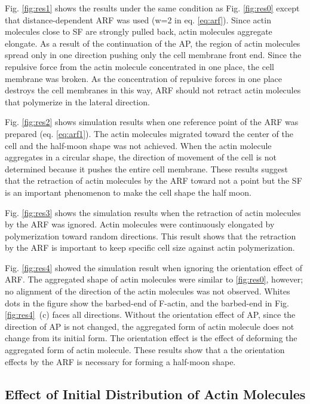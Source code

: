 \documentclass[a4paper,12pt, oneside]{book}
\begin{document}
Fig. \ref{fig:res1} shows the results under the same condition as Fig. \ref{fig:res0} except that distance-dependent ARF was  used (w=2 in eq. \ref{eq:arf}).
Since actin molecules close to SF are strongly pulled back, actin molecules aggregate elongate.
As a result of the continuation of the AP, the region of actin molecules spread only in one direction pushing only the cell membrane front end.
Since the repulsive force from the actin molecule concentrated in one place, the cell membrane was broken.
As the concentration of repulsive forces in one place destroys the cell membranes in this way, ARF should not retract actin molecules that polymerize in the lateral direction.

Fig. \ref{fig:res2} shows simulation results when one reference point of the ARF was prepared (eq. \ref{eq:arf1}).
The actin molecules migrated toward the center of the cell and the half-moon shape was not achieved.
When the actin molecule aggregates in a circular shape, the direction of movement of the cell is not determined because it pushes the entire cell membrane.
These results suggest that the retraction of actin molecules by the ARF toward not a point but the SF is an important phenomenon to make the cell shape the half moon.

Fig. \ref{fig:res3} shows the simulation results when the retraction of actin molecules by the ARF was ignored.
Actin molecules were continuously elongated by  polymerization toward  random directions.
This result shows that the retraction by the ARF is important to keep specific cell size against actin polymerization.

Fig. \ref{fig:res4} showed the simulation result when ignoring the orientation effect of ARF.
The aggregated shape of actin molecules were similar to \ref{fig:res0}, however; no alignment of the direction of the actin molecules was not observed.
Whites dots in the figure show the barbed-end of F-actin, and the barbed-end in Fig.\ref{fig:res4}~(c) faces all directions.
Without the orientation effect of AP, since the direction of AP is not changed, the aggregated form of actin molecule does not change from its initial form.
The orientation effect is the effect of deforming the aggregated form of actin molecule.
These results show that a the orientation effects by the ARF is necessary for forming a half-moon shape.

\subsection{Effect of Initial Distribution of Actin Molecules}
\end{document}
